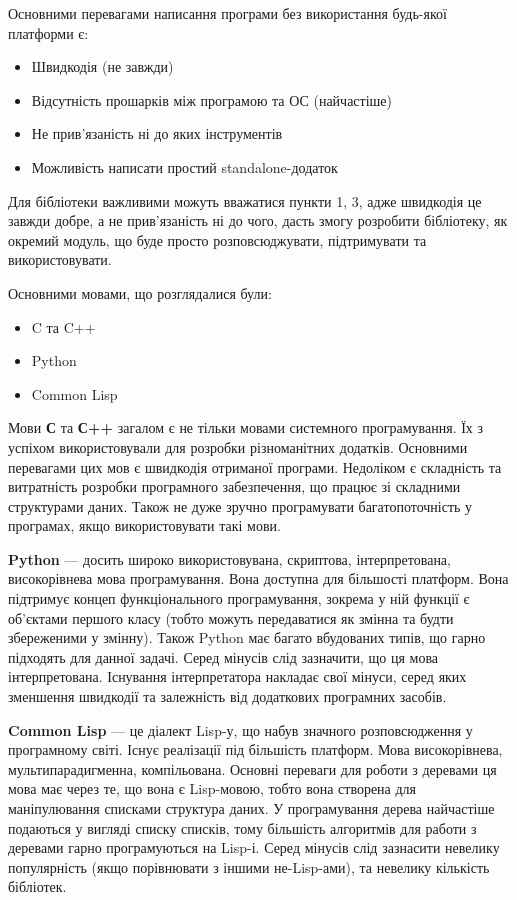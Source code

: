 Основними перевагами написання програми без використання будь-якої платформи є:
\begin{itemize}
	\item Швидкодія (не завжди)
	\item Відсутність прошарків між програмою та ОС (найчастіше)
	\item Не прив'язаність ні до яких інструментів
	\item Можливість написати простий standalone-додаток
\end{itemize}

Для бібліотеки важливими можуть вважатися пункти 1, 3, адже швидкодія це завжди добре, а не прив'язаність ні до чого, дасть змогу розробити бібліотеку, як окремий модуль, що буде просто розповсюджувати, підтримувати та використовувати.

Основними мовами, що розглядалися були:
\begin{itemize}
	\item C та C++
	\item Python
	\item Common Lisp
\end{itemize}

Мови \textbf{С} та \textbf{С++} загалом є не тільки мовами системного програмування. Їх з успіхом використовували для розробки різноманітних додатків. Основними перевагами цих мов є швидкодія отриманої програми. Недоліком є складність та витратність розробки програмного забезпечення, що працює зі складними структурами даних. Також не дуже зручно програмувати багатопоточність у програмах, якщо використовувати такі мови.

\textbf{Python} --- досить широко використовувана, скриптова, інтерпретована, високорівнева мова програмування. Вона доступна для більшості платформ. Вона підтримує концеп функціонального програмування, зокрема у ній функції є об'єктами першого класу (тобто можуть передаватися як змінна та будти збереженими у змінну). Також Python має багато вбудованих типів, що гарно підходять для данної задачі. Серед мінусів слід зазначити, що ця мова інтерпретована. Існування інтерпретатора накладає свої мінуси, серед яких зменшення швидкодії та залежність від додаткових програмних засобів.

\textbf{Common Lisp} --- це діалект Lisp-у, що набув значного розповсюдження у програмному світі. Існує реалізації під більшість платформ. Мова високорівнева, мультипарадигменна, компільована. Основні переваги для роботи з деревами ця мова має через те, що вона є Lisp-мовою, тобто вона створена для маніпулювання списками структура даних. У програмування дерева найчастіше подаються у вигляді списку списків, тому більшість алгоритмів для работи з деревами гарно програмуються на Lisp-і. Серед мінусів слід зазнасити невелику популярність (якщо порівнювати з іншими не-Lisp-ами), та невелику кількість бібліотек.

